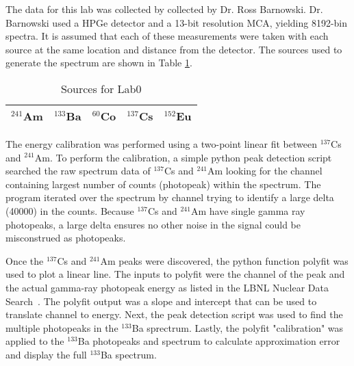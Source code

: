 The data for this lab was collected by collected by Dr. Ross Barnowski. Dr. Barnowski used a HPGe detector and a 13-bit resolution MCA, yielding 8192-bin spectra. It is assumed that each of these measurements were taken with each source at the same location and distance from the detector. The sources used to generate the spectrum are shown in Table \ref{tab:sources}.

\begin{table}[H]
\centering
\caption{Sources for Lab0}
\label{tab:sources}
\begin{tabular}{@{}lllll@{}}
\toprule
$^{241}$Am & $^{133}$Ba & $^{60}$Co & $^{137}$Cs & $^{152}$Eu \\ \bottomrule
\end{tabular}
\end{table}

The energy calibration was performed using a two-point linear fit between $^{137}$Cs and $^{241}$Am. To perform the calibration, a simple python peak detection script searched the raw spectrum data of $^{137}$Cs and $^{241}$Am looking for the channel containing largest number of counts (photopeak) within the spectrum. The program iterated over the spectrum by channel trying to identify a large delta (40000) in the counts. Because $^{137}$Cs and $^{241}$Am have single gamma ray photopeaks, a large delta ensures no other noise in the signal could be misconstrued as photopeaks.

Once the $^{137}$Cs and $^{241}$Am peaks were discovered, the python function polyfit was used to plot a linear line. The inputs to polyfit were the channel of the peak and the actual gamma-ray photopeak energy as listed in the LBNL Nuclear Data Search~\cite{chu_ekstrom_firestone_1999}. The polyfit output was a slope and intercept that can be used to translate channel to energy. Next, the peak detection script was used to find the multiple photopeaks in the $^{133}$Ba sprectrum. Lastly, the polyfit "calibration" was applied to the $^{133}$Ba photopeaks and spectrum to calculate approximation error and display the full $^{133}$Ba spectrum.
